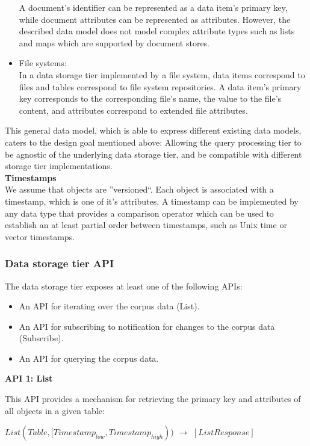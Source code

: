 \begin{itemize}
  A document's identifier can be represented as a data item's primary key, while document attributes can be represented
  as attributes.
  However, the described data model does not model complex attribute types such as lists and maps which are supported by
  document stores.
  \item File systems: \\
  In a data storage tier implemented by a file system, data items correspond to files and tables correspond to file
  system repositories.
  A data item's primary key corresponds to the corresponding file's name, the value to the file's content, and attributes
  correspond to extended file attributes.
\end{itemize}

This general data model, which is able to express different existing data models, caters to the design goal mentioned
above:
Allowing the query processing tier to be agnostic of the underlying data storage tier, and be compatible with different
storage tier implementations. \\

\noindent \textbf{Timestamps} \\
We assume that objects are ''versioned``.
Each object is associated with a timestamp, which is one of it's attributes.
A timestamp can be implemented by any data type that provides a comparison operator which can be used to establish an
at least partial order between timestamps, such as Unix time or vector timestamps.


\subsubsection{Data storage tier API}

The data storage tier exposes at least one of the following APIs:
\begin{itemize}
  \item An API for iterating over the corpus data (List).
  \item An API for subscribing to notification for changes to the corpus data (Subscribe).
  \item An API for querying the corpus data.
\end{itemize}

\noindent
\textbf{API 1: List}

\noindent
This API provides a mechanism for retrieving the primary key and attributes of all objects in a given table:

$List(Table, [Timestamp_{low}, Timestamp_{high}))$ $\rightarrow$ $[ListResponse]$

